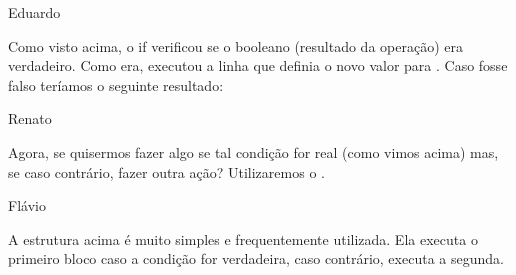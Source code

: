 \documentclass[letterpaper,10pt,english]{jupyterBook}
\begin{document}
\begin{sphinxVerbatim}[commandchars=\\\{\}]
\PYGZsq{}Eduardo\PYGZsq{}
\end{sphinxVerbatim}

\sphinxAtStartPar
Como visto acima, o if verificou se o booleano (resultado da operação) era verdadeiro. Como era, executou a linha que definia o novo valor para . Caso fosse falso teríamos o seguinte resultado:

\begin{sphinxVerbatim}[commandchars=\\\{\}]
  
   
      
\end{sphinxVerbatim}

\begin{sphinxVerbatim}[commandchars=\\\{\}]
\PYGZsq{}Renato\PYGZsq{}
\end{sphinxVerbatim}

\sphinxAtStartPar
Agora, se quisermos fazer algo se tal condição for real (como vimos acima) mas, se caso contrário, fazer outra ação? Utilizaremos o .

\begin{sphinxVerbatim}[commandchars=\\\{\}]
  
 
      
      
\end{sphinxVerbatim}

\begin{sphinxVerbatim}[commandchars=\\\{\}]
\PYGZsq{}Flávio\PYGZsq{}
\end{sphinxVerbatim}

\sphinxAtStartPar
A estrutura acima é muito simples e frequentemente utilizada. Ela executa o primeiro bloco caso a condição for verdadeira, caso contrário, executa a segunda.
\end{document}
